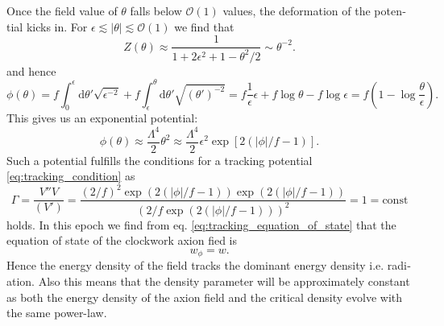 \documentclass[master,       %
               twoside,        %
               BCOR10mm,       %
               english,ngerman, %
               ]{GAUBM}
\begin{document}
\begin{otherlanguage}{english}
Once the field value of $\theta$ falls below $\mathcal{O}(1)$ values, the deformation of the potential kicks in.
For $\epsilon \lesssim |\theta| \lesssim \mathcal{O}(1)$ we find that
\begin{equation}
	Z(\theta) \approx \frac{1}{1 + 2\epsilon^2 + 1 - \theta^2/2} \sim \theta^{-2}.
\end{equation}
and hence
\begin{equation}
	\phi(\theta) = f \int_0^\epsilon \mathrm{d} \theta' \sqrt{\epsilon^{-2}} + f \int_\epsilon^\theta \mathrm{d} \theta' \sqrt{ (\theta')^{-2}} = f \frac{1}{\epsilon} \epsilon + f \log \theta - f \log \epsilon = f \left(1 - \log \frac{\theta}{\epsilon}\right).
\end{equation}
This gives us an exponential potential:
\begin{equation}
	\phi(\theta) \approx \frac{\Lambda^4}{2} \theta^2 \approx \frac{\Lambda^4}{2} \epsilon^2 \exp \left[ 2 ( | \phi | / f - 1 ) \right].
\end{equation}
Such a potential fulfills the conditions for a tracking potential \eqref{eq:tracking_condition} as
\begin{equation}
	\Gamma = \frac{V'' V}{(V')} = \frac{(2/f)^2 \exp(2(|\phi| / f - 1)) \exp(2(|\phi| / f - 1))}{(2/f \exp(2(|\phi| / f - 1)))^2} = 1 = \mathrm{const}
\end{equation}
holds.
In this epoch we find from eq. \eqref{eq:tracking_equation_of_state} that the equation of state of the clockwork axion fied is
\begin{equation}
	w_\phi = w.
\end{equation}
Hence the energy density of the field tracks the dominant energy density i.e. radiation.
Also this means that the density parameter will be approximately constant as both the energy density of the axion field and the critical density evolve with the same power-law.


\end{otherlanguage}
\end{document}
